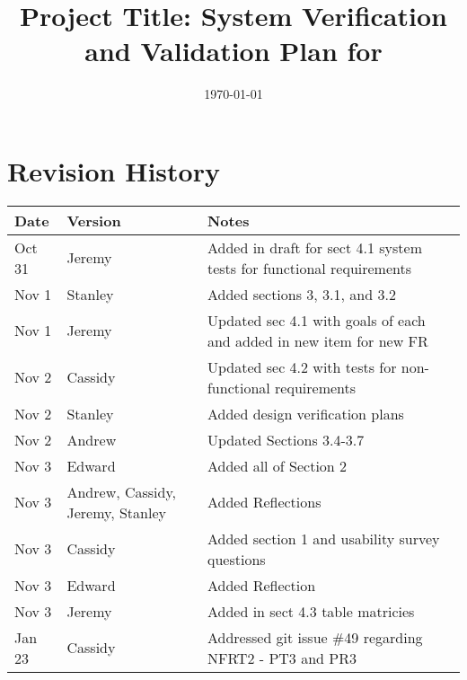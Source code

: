 \documentclass[12pt, titlepage]{article}
\begin{document}
\title{Project Title: System Verification and Validation Plan for \progname{}} 
\author{\authname}
\date{\today}
	
\maketitle


\section{Revision History}

\begin{tabularx}{\textwidth}{p{3cm}p{2cm}X}
\toprule {\bf Date} & {\bf Version} & {\bf Notes}\\
\midrule
Oct 31 & Jeremy & Added in draft for sect 4.1 system tests for functional requirements \\ 
Nov 1 & Stanley & Added sections 3, 3.1, and 3.2 \\
Nov 1 & Jeremy & Updated sec 4.1 with goals of each and added in new item for new FR \\
Nov 2 & Cassidy & Updated sec 4.2 with tests for non-functional requirements \\
Nov 2 & Stanley & Added design verification plans \\
Nov 2 & Andrew & Updated Sections 3.4-3.7\\
Nov 3 & Edward & Added all of Section 2\\
Nov 3 & Andrew, Cassidy, Jeremy, Stanley & Added Reflections\\
Nov 3 & Cassidy & Added section 1 and usability survey questions \\
Nov 3 & Edward & Added Reflection\\
Nov 3 & Jeremy & Added in sect 4.3 table matricies\\
Jan 23 & Cassidy & Addressed git issue \#49 regarding NFRT2 - PT3 and PR3 \\
\bottomrule
\end{tabularx}

%
\end{document}
